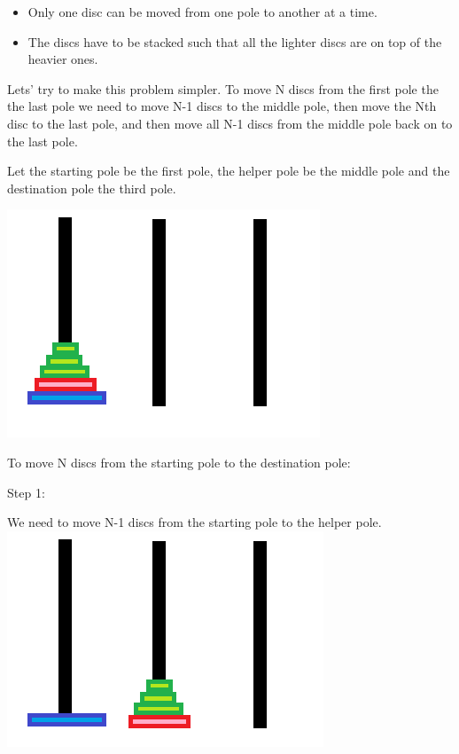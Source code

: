 \documentclass[11pt,oneside]{book}
\makeatletter
\def\maxwidth#1{\ifdim\Gin@nat@width>#1 #1\else\Gin@nat@width\fi}
\makeatother
\begin{document}
\begin{itemize}
\item Only one disc can be moved from one pole to another at a time.
\item The discs have to be stacked such that all the lighter discs are on top of the heavier ones.
\end{itemize}

Lets' try to make this problem simpler. To move N discs from the first pole the the last pole we need to move N-1 discs to the middle pole, then move the Nth disc to the last pole, and then move all N-1 discs from the middle pole back on to the last pole.

Let the starting pole be the first pole, the helper pole be the middle pole and the destination pole the third pole.

\vspace{5px}\includegraphics[width=\maxwidth{\textwidth}]{hanoi.png}

To move N discs from the starting pole to the destination pole:

Step 1:

We need to move N-1 discs from the starting pole to the helper pole.
\vspace{5px}\includegraphics[width=\maxwidth{\textwidth}]{hanoi2.png}
\end{document}
